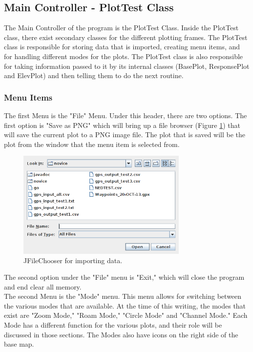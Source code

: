 \documentclass[12pt]{article}
\begin{document}
\subsection{Main Controller - PlotTest Class}

The Main Controller of the program is the PlotTest Class. Inside the PlotTest class, there exist secondary classes for the different plotting frames. The PlotTest class is responsible for storing data that is imported, creating menu items, and for handling different modes for the plots. The PlotTest class is also responsible for taking information passed to it by its internal classes (BasePlot, ResponsePlot and ElevPlot) and then telling them to do the next routine. \\

\subsubsection{Menu Items}

The first Menu is the "File" Menu. Under this header, there are two options. The first option is "Save as PNG"  which will bring up a file browser (Figure \ref{FIG:PNG}) that will save the current plot to a PNG image file. The plot that is saved will be the plot from the window that the menu item is selected from.

\begin{figure}[H]
\centering
\includegraphics[width=0.75\textwidth]{./figs/fig0.png}
\caption{JFileChooser for importing data.}
\label{FIG:PNG}
\end{figure}

The second option under the "File" menu is "Exit," which will close the program and end clear all memory. \\

The second Menu is the "Mode" menu. This menu allows for switching between the various modes that are available. At the time of this writing, the modes that exist are "Zoom Mode," "Roam Mode," "Circle Mode" and "Channel Mode." Each Mode has a different function for the various plots, and their role will be discussed in those sections. The Modes also have icons on the right side of the base map. \\
\end{document}

